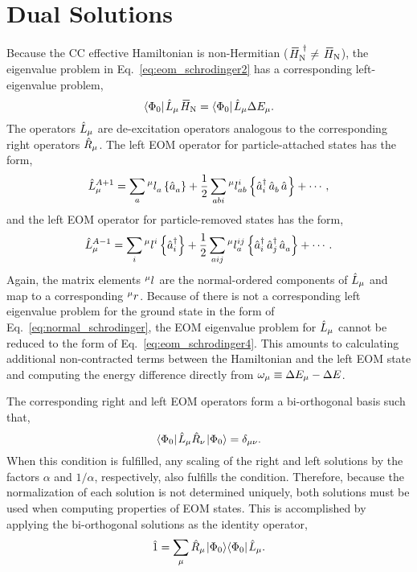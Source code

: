\documentclass[thesis.tex]{subfiles}
\begin{document}
\section{Dual Solutions} \label{section:eom_dual}

Because the CC effective Hamiltonian is non-Hermitian ($\EHamN^{\dagger} \neq \EHamN$), the eigenvalue problem in Eq.\ \eqref{eq:eom_schrodinger2} has a corresponding left-eigenvalue problem,
\begin{equation} \label{eq:eom_dual1}
  \refbra\Lop_{\mu}\EHamN = \refbra\Lop_{\mu}\Ecorr_{\mu}.
\end{equation}
The operators $\hat{L}\hspace{-0.1pt}_{\mu}$ are de-excitation operators analogous to the corresponding right operators $\hat{R}\hspace{-0.1pt}_{\mu}$.  The left EOM operator for particle-attached states has the form,
\begin{equation}
  \hat{L}\hspace{-0.1pt}^{A+1}_{\mu} = \sum_{a}{}^{\mu}l^{\hspace{0.1pt}}_{a}\left\{\mathop{\hat{a}^{}_{a}}\right\} + \frac{1}{2}\sum_{abi}{}^{\mu}l^{\hspace{0.1pt}i}_{ab}\left\{\mathop{\hat{a}^{\dagger}_{i}}\mathop{\hat{a}^{}_{b}}\mathop{\hat{a}^{}_{}}\right\} + \cdots,
\end{equation}
and the left EOM operator for particle-removed states has the form,
\begin{equation}
  \hat{L}\hspace{-0.1pt}^{A-1}_{\mu} = \sum_{i}{}^{\mu}l^{\hspace{0.1pt}i}_{}\left\{\mathop{\hat{a}^{\dagger}_{i}}\right\} + \frac{1}{2}\sum_{aij}{}^{\mu}l^{\hspace{0.1pt}ij}_{a}\left\{\mathop{\hat{a}^{\dagger}_{i}}\mathop{\hat{a}^{\dagger}_{j}}\mathop{\hat{a}^{}_{a}}\right\} + \cdots.
\end{equation}
Again, the matrix elements ${}^{\mu}l^{\hspace{0.1pt}}_{}$ are the normal-ordered components of $\hat{L}\hspace{-0.1pt}_{\mu}$ and map to a corresponding ${}^{\mu}r^{}_{}$.  Because of there is not a corresponding left eigenvalue problem for the ground state in the form of Eq.\ \eqref{eq:normal_schrodinger}, the EOM eigenvalue problem for $\hat{L}\hspace{-0.1pt}_{\mu}$ cannot be reduced to the form of Eq.\ \eqref{eq:eom_schrodinger4}.  This amounts to calculating additional non-contracted terms between the Hamiltonian and the left EOM state and computing the energy difference directly from $\omega_{\mu} \equiv \Delta E_{\mu} - \Delta E$.

The corresponding right and left EOM operators form a bi-orthogonal basis such that,
\begin{equation}
  \langle \Phi_{0} |\hspace{1pt}\hat{L}\hspace{-0.1pt}_{\mu}\hat{R}\hspace{-0.1pt}_{\nu}\hspace{1pt}\lvert \Phi_{0} \rangle = \delta_{\mu\nu}.
\end{equation}
When this condition is fulfilled, any scaling of the right and left solutions by the factors $\alpha$ and $1/\alpha$, respectively, also fulfills the condition.  Therefore, because the normalization of each solution is not determined uniquely, both solutions must be used when computing properties of EOM states.  This is accomplished by applying the bi-orthogonal solutions as the identity operator,
\begin{gather}
  \hat{1} = \sum_{\mu} \hat{R}\hspace{-0.1pt}_{\mu}\hspace{1pt}\lvert \Phi_{0} \rangle\langle \Phi_{0} |\hspace{1pt}\hat{L}\hspace{-0.1pt}_{\mu}.
\end{gather}
\end{document}
